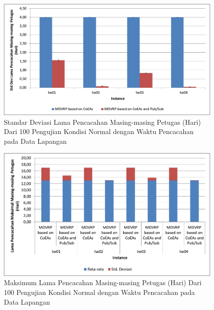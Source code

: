 \begin{figure}[!]
	\centering
	\includegraphics[width=\textwidth]{Resources/Images/test_result_real_tw_stdev_of_total_time}
	\captionsetup{format=hang}
	\caption{Standar Deviasi Lama Pencacahan Masing-masing Petugas (Hari) Dari 100 Pengujian Kondisi Normal dengan Waktu Pencacahan pada Data Lapangan}
	\label{fig:test_result_real_tw_stdev_of_total_time}
\end{figure}


\begin{figure}[!]
	\centering
	\includegraphics[width=\textwidth]{Resources/Images/test_result_real_tw_mean_stdev_of_total_time}
	\captionsetup{format=hang}
	\caption{Maksimum Lama Pencacahan Masing-masing Petugas (Hari) Dari 100 Pengujian Kondisi Normal dengan Waktu Pencacahan pada Data Lapangan}
	\label{fig:test_result_real_tw_mean_stdev_of_total_time}
\end{figure}


